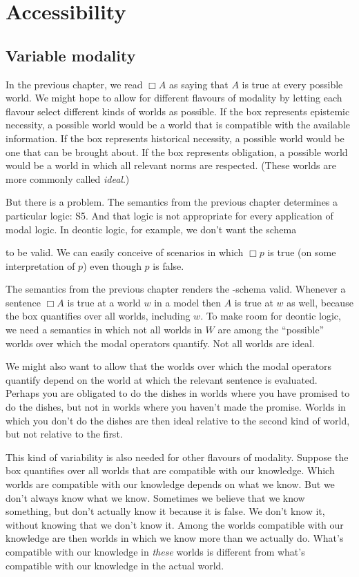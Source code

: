 \chapter{Accessibility}\label{ch:accessibility}

\section{Variable modality}

In the previous chapter, we read $\Box A$ as saying that $A$ is true at every
possible world. We might hope to allow for different flavours of modality by
letting each flavour select different kinds of worlds as possible. If the box
represents epistemic necessity, a possible world would be a world that is
compatible with the available information. If the box represents historical
necessity, a possible world would be one that can be brought about. If the box
represents obligation, a possible world would be a world in which all relevant
norms are respected. (These worlds are more commonly called \emph{ideal}.)

But there is a problem. The semantics from the previous chapter determines a
particular logic: S5. And that logic is not appropriate for every application of
modal logic. In deontic logic, for example, we don't want the schema
%
\begin{principles}
\end{principles}
%
to be valid. We can easily conceive of scenarios in which $\Box p$ is true (on
some interpretation of $p$) even though $p$ is false.

The semantics from the previous chapter renders the -schema valid.
Whenever a sentence $\Box A$ is true at a world $w$ in a model then $A$ is true
at $w$ as well, because the box quantifies over all worlds, including $w$. To
make room for deontic logic, we need a semantics in which not all worlds in $W$
are among the ``possible'' worlds over which the modal operators quantify. Not
all worlds are ideal.

We might also want to allow that the worlds over which the modal operators
quantify depend on the world at which the relevant sentence is evaluated.
Perhaps you are obligated to do the dishes in worlds where you have promised to
do the dishes, but not in worlds where you haven't made the promise. Worlds in
which you don't do the dishes are then ideal relative to the second kind of
world, but not relative to the first.

This kind of variability is also needed for other flavours of modality. Suppose
the box quantifies over all worlds that are compatible with our knowledge. Which
worlds are compatible with our knowledge depends on what we know. But we don't
always know what we know. Sometimes we believe that we know something, but don't
actually know it because it is false. We don't know it, without knowing that we
don't know it. \label{par:notB}Among the worlds compatible with our knowledge
are then worlds in which we know more than we actually do. What's
compatible with our knowledge in \emph{these} worlds is different from what's
compatible with our knowledge in the actual world.


